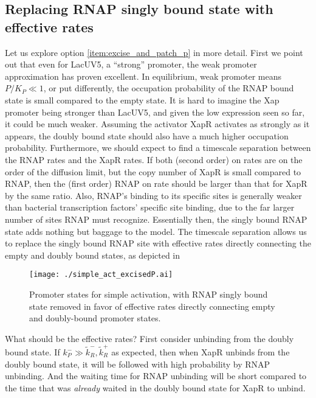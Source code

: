 \documentclass[12pt]{article}%
\newcommand{\rate}[3]{{#1}_{#2}^{#3}}
\begin{document}
\subsection{Replacing RNAP singly bound state with effective rates}
Let us explore option \ref{item:excise_and_patch_p} in more detail.
First we point out that even for LacUV5, a ``strong'' promoter,
the weak promoter approximation has proven excellent.
In equilibrium, weak promoter means $P/K_P \ll 1$, or put differently,
the occupation probability of the RNAP bound state is small compared to the empty state.
It is hard to imagine the Xap promoter being stronger than LacUV5,
and given the low expression seen so far, it could be much weaker.
Assuming the activator XapR activates as strongly as it appears,
the doubly bound state should also have a much higher occupation probability.
Furthermore, we should expect to find a timescale separation
between the RNAP rates and the XapR rates.
If both (second order) on rates are on the order of the diffusion limit,
but the copy number of XapR is small compared to RNAP,
then the (first order) RNAP on rate should be larger than that for XapR by the same ratio.
Also, RNAP's binding to its specific sites is generally weaker than
bacterial transcription factors' specific site binding,
due to the far larger number of sites RNAP must recognize.
Essentially then, the singly bound RNAP state adds nothing but baggage to the model.
The timescale separation allows us to replace the singly bound RNAP site
with effective rates directly connecting the empty and doubly bound states,
as depicted in 
\begin{figure}
    \begin{center}
        \texttt{[image: ./simple\_act\_excisedP.ai]}
    \end{center}
    \caption{
            Promoter states for simple activation,
            with RNAP singly bound state removed in favor of effective rates
            directly connecting empty and doubly-bound promoter states.
            }
    \label{fig:3state_loop}
\end{figure}

What should be the effective rates? 
First consider unbinding from the doubly bound state.
If $\rate{k}{P}{-} \gg \rate{\tilde{k}}{R}{-}, \rate{\tilde{k}}{R}{+}$ as expected,
then when XapR unbinds from the doubly bound state,
it will be followed with high probability by RNAP unbinding.
And the waiting time for RNAP unbinding will be short compared to the time
that was \textit{already} waited in the doubly bound state for XapR to unbind.
\end{document}
